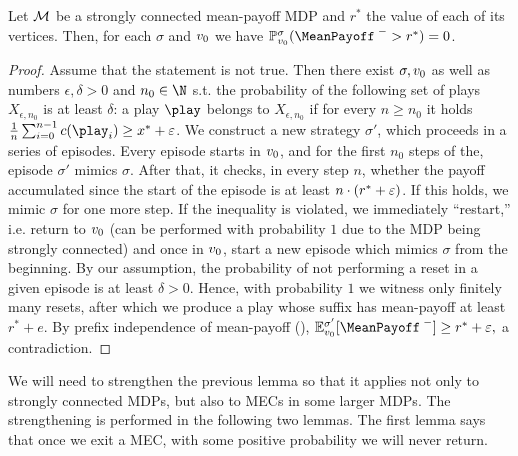 \begin{lemma}
\label{5-lem:MEC-mp-strict-bound}
Let $\mathcal{M}$ be a strongly connected mean-payoff MDP and $r^*$ the value of each of its vertices. Then, for each $\sigma$ and $v_0$ we have $\probm^\sigma_{\vinit}(\MeanPayoffInf > r^*) = 0 $.
\end{lemma}
\begin{proof}
Assume that the statement is not true. Then there exist $\sigma,v_0$ as well as numbers $\epsilon,\delta>0 $ and $n_0 \in \N$ s.t. the probability of the following set of plays $X_{\epsilon,n_0}$ is at least $\delta$: a play $\play$ belongs to $X_{\epsilon,n_0}$ if for every $n\geq n_0$ it holds $\frac{1}{n}\sum_{i=0}^{n-1}\colouring(\play_i) \geq x^* + \eps$. We construct a new strategy $\sigma'$, which proceeds in a series of episodes. Every episode starts in $v_0$, and for the first $n_0$ steps of the, episode $\sigma'$ mimics $\sigma$. After that, it checks, in every step $n$, whether the payoff accumulated since the start of the episode is at least $n\cdot(r^* + \varepsilon)$. If this holds, we mimic $\sigma$ for one more step. If the inequality is violated, we immediately ``restart,'' i.e. return to $v_0$ (can be performed with probability $1$ due to the MDP being strongly connected) and once in $v_0$, start a new episode which mimics $\sigma$ from the beginning. By our assumption, the probability of not performing a reset in a given episode is at least $\delta>0$. Hence, with probability $1$ we witness only finitely many resets, after which we produce a play whose suffix has mean-payoff at least $r^* + e$. By prefix independence of mean-payoff (), $\expv^{\sigma'}_{\vinit} [\MeanPayoffInf] \geq r^* + \eps,$ a contradiction.
\end{proof}

We will need to strengthen the previous lemma so that it applies not only to strongly connected MDPs, but also to MECs in some larger MDPs. The strengthening is performed in the following two lemmas. The first lemma says that once we exit a MEC, with some positive probability we will never return.

